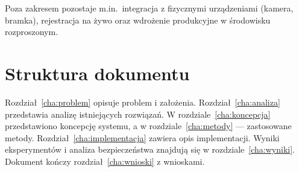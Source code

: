 Poza zakresem pozostaje m.in.\ integracja z fizycznymi urządzeniami (kamera, bramka), rejestracja na żywo oraz wdrożenie produkcyjne w środowisku rozproszonym.

\section{Struktura dokumentu}

Rozdział~\ref{cha:problem} opisuje problem i założenia. Rozdział~\ref{cha:analiza} przedstawia analizę istniejących rozwiązań. W rozdziale~\ref{cha:koncepcja} przedstawiono koncepcję systemu, a w rozdziale~\ref{cha:metody} --- zastosowane metody. Rozdział~\ref{cha:implementacja} zawiera opis implementacji. Wyniki eksperymentów i analiza bezpieczeństwa znajdują się w rozdziale~\ref{cha:wyniki}. Dokument kończy rozdział~\ref{cha:wnioski} z wnioskami.
